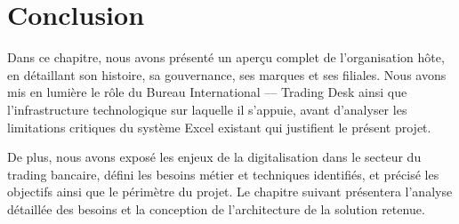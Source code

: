 \section*{Conclusion}
\hspace{1cm}
Dans ce chapitre, nous avons présenté un aperçu complet de l'organisation hôte, en détaillant son histoire, sa gouvernance, ses marques et ses filiales. Nous avons mis en lumière le rôle du Bureau International --- Trading Desk ainsi que l'infrastructure technologique sur laquelle il s'appuie, avant d'analyser les limitations critiques du système Excel existant qui justifient le présent projet.

De plus, nous avons exposé les enjeux de la digitalisation dans le secteur du trading bancaire, défini les besoins métier et techniques identifiés, et précisé les objectifs ainsi que le périmètre du projet. Le chapitre suivant présentera l'analyse détaillée des besoins et la conception de l'architecture de la solution retenue.
